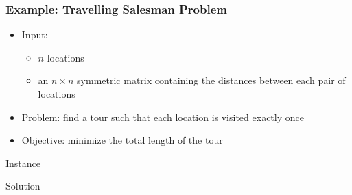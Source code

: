 \documentclass[10pt]{beamer}
\begin{document}
\begin{frame}
  \frametitle{Example: Travelling Salesman Problem}

  \small
  \begin{itemize}
    \item Input:
      \begin{itemize}
        \item $n$ locations
        \item an $n \times n$ symmetric matrix containing the distances between each pair of locations
      \end{itemize}
    \item Problem: find a tour such that each location is visited exactly once
    \item Objective: minimize the total length of the tour
  \end{itemize}

  \centering
  \begin{minipage}[t]{0.30\linewidth}
    \pause
    \centering
    Instance
    \bigskip

    \def\svgwidth{\columnwidth}
    
  \end{minipage}
  \hspace{1cm}
  \begin{minipage}[t]{0.30\linewidth}
    \pause
    \centering
    Solution
    \bigskip

    \def\svgwidth{\columnwidth}
    
  \end{minipage}
\end{frame}
\end{document}

